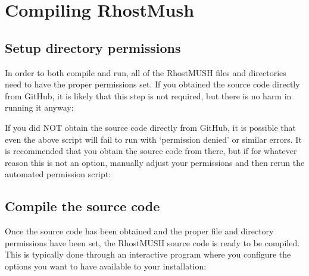 \documentclass[letterpaper,10pt,english]{sphinxmanual}
\begin{document}
\section{Compiling RhostMush}
\label{\detokenize{install:compiling-rhostmush}}\label{\detokenize{install:id6}}

\subsection{Setup directory permissions}
\label{\detokenize{install:setup-directory-permissions}}
\sphinxAtStartPar
In order to both compile and run, all of the RhostMUSH files and directories
need to have the proper permissions set. If you obtained the source code
directly from GitHub, it is likely that this step is not required, but there
is no harm in running it anyway:

\begin{sphinxVerbatim}[commandchars=\\\{\}]
\end{sphinxVerbatim}

\sphinxAtStartPar
If you did NOT obtain the source code directly from GitHub, it is possible that
even the above script will fail to run with ‘permission denied’ or similar
errors. It is recommended that you obtain the source code from there, but if
for whatever reason this is not an option, manually adjust your permissions
and then re\sphinxhyphen{}run the automated permission script:

\begin{sphinxVerbatim}[commandchars=\\\{\}]
      
\end{sphinxVerbatim}


\subsection{Compile the source code}
\label{\detokenize{install:compile-the-source-code}}
\sphinxAtStartPar
Once the source code has been obtained and the proper file and directory
permissions have been set, the RhostMUSH source code is ready to be compiled.
This is typically done through an interactive program where you configure the
options you want to have available to your installation:
\end{document}
